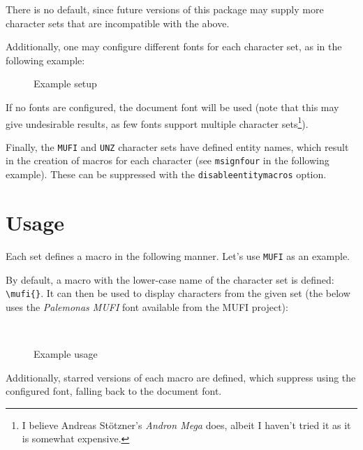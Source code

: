 \documentclass{article}
\begin{document}
There is no default, since future versions of this package may supply more character sets that are incompatible with the above.

Additionally, one may configure different fonts for each character set, as in the following example:

\begin{figure}[H]
\centering
\begin{verbatimtab}
\usepackage[
	MUFI,
	TITUS,
	fonts={
		MUFI=\mufifont,
		TITUS=\titusfont,
	},
]{unicode-alphabets}
\end{verbatimtab}
\caption{Example setup}
\end{figure}

If no fonts are configured, the document font will be used (note that this may give undesirable results, as few fonts support multiple character sets\footnote{I believe Andreas Stötzner's \emph{Andron Mega} does, albeit I haven't tried it as it is somewhat expensive.}).

Finally, the \verb|MUFI| and \verb|UNZ| character sets have defined entity names, which result in the creation of macros for each character (see \verb|msignfour| in the following example). These can be suppressed with the \verb|disableentitymacros| option.

\section{Usage}

Each set defines a macro in the following manner. Let's use \verb|MUFI| as an example.

By default, a macro with the lower-case name of the character set is defined: \verb|\mufi{}|. It can then be used to display characters from the given set (the below uses the \emph{Palemonas MUFI} font available from the MUFI project):

\begin{figure}[H]
\centering
\begin{LTXexample}[varwidth=true]
\\
\msignflour{}
\end{LTXexample}
\caption{Example usage}
\end{figure}

Additionally, starred versions of each macro are defined, which suppress using the configured font, falling back to the document font.

\printbibliography
\end{document}
